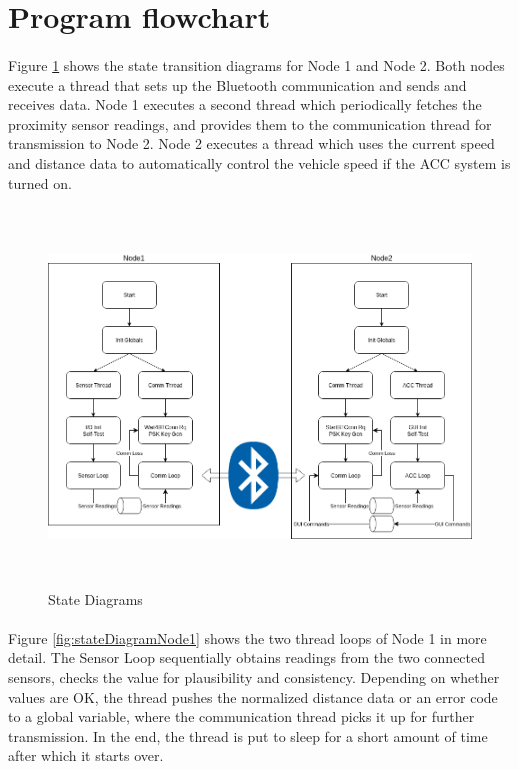 \section{Program flowchart}
\label{chapter3}


\paragraph{}
Figure \ref{fig:stateDiagrams} shows the state transition diagrams for Node 1 and Node 2. Both nodes execute a thread that sets up the Bluetooth communication and sends and receives data. Node 1 executes a second thread which periodically fetches the proximity sensor readings, and provides them to the communication thread for transmission to Node 2. Node 2 executes a thread which uses the current speed and distance data to automatically control the vehicle speed if the ACC system is turned on.

\begin{figure}[h]
	\includegraphics[height=100mm]{images/StateDiagrams.png}
	\centering
	\caption{State Diagrams}
	\label{fig:stateDiagrams}
\end{figure}

\paragraph{}
Figure \ref{fig:stateDiagramNode1} shows the two thread loops of Node 1 in more detail. The Sensor Loop sequentially obtains readings from the two connected sensors, checks the value for plausibility and consistency. Depending on whether values are OK, the thread pushes the normalized distance data or an error code to a global variable, where the communication thread picks it up for further transmission. In the end, the thread is put to sleep for a short amount of time after which it starts over.

